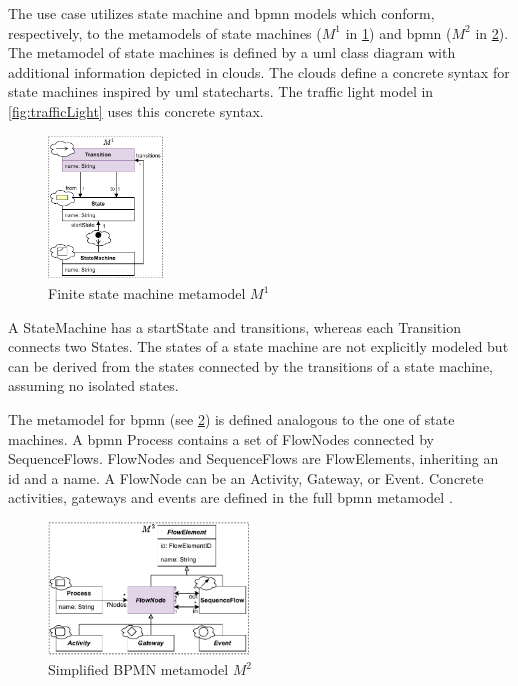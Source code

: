 \documentclass{jot}
\begin{document}
The use case utilizes state machine and \gls*{bpmn} models which conform, respectively, to the metamodels of state machines ($M^1$ in \cref{fig:fsm_metamodel}) and \gls*{bpmn} ($M^2$ in \cref{fig:bpmn_metamodel}).
The metamodel of state machines is defined by a \gls*{uml} class diagram with additional information depicted in clouds.
The clouds define a concrete syntax for state machines inspired by \gls*{uml} statecharts.
The traffic light model in \cref{fig:trafficLight} uses this concrete syntax. 

\begin{figure}[h]
    \centering
    \includegraphics[width=0.275\textwidth]{figures/state_machine_metamodel.pdf}
    \caption{Finite state machine metamodel $M^1$}
    \label{fig:fsm_metamodel}
\end{figure}

A \textsf{StateMachine} has a \textsf{startState} and \textsf{transitions}, whereas each \textsf{Transition} connects two \textsf{State}s.
The states of a state machine are not explicitly modeled but can be derived from the states connected by the transitions of a state machine, assuming no isolated states.

The metamodel for \gls*{bpmn} (see \cref{fig:bpmn_metamodel}) is defined analogous to the one of state machines. 
A \gls*{bpmn} \textsf{Process} contains a set of \textsf{FlowNode}s connected by \textsf{SequenceFlow}s.
\textsf{FlowNode}s and \textsf{SequenceFlow}s are \textsf{FlowElement}s, inheriting an \textsf{id} and a \textsf{name}.
A \textsf{FlowNode} can be an \textsf{Activity}, \textsf{Gateway}, or \textsf{Event}.
Concrete activities, gateways and events are defined in the full \gls*{bpmn} metamodel \cite{objectmanagementgroupBusinessProcessModel2013}. %

\begin{figure}[h]
    \centering
    \includegraphics[width=0.475\textwidth]{figures/bpmn_metamodel.pdf}
    \caption{Simplified BPMN metamodel $M^2$ \cite{objectmanagementgroupBusinessProcessModel2013}}
    \label{fig:bpmn_metamodel}
\end{figure}
\end{document}
